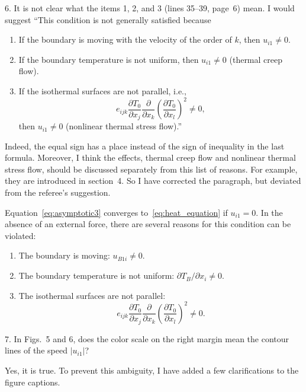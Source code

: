 \documentclass{article}
\newcommand{\pder}[2][]{\frac{\partial#1}{\partial#2}}
\newcommand{\Pder}[2][]{\partial#1/\partial#2}
\begin{document}
\begin{quoting}
6. It is not clear what the items 1, 2, and 3 (lines 35--39, page~6)
mean. I would suggest ``This condition is not generally satisfied because
\begin{enumerate}
\item If the boundary is moving with the velocity of the order of \(k\), then \(u_{i1} \neq 0\).
\item If the boundary temperature is not uniform, then \(u_{i1} \neq 0\) (thermal creep flow).
\item If the isothermal surfaces are not parallel, i.e.,
\[e_{ijk}\pder[T_0]{x_j}\pder{x_k}\left(\pder[T_0]{x_l}\right)^2 \neq 0, \]
then \(u_{i1} \neq 0\) (nonlinear thermal stress flow).''
\end{enumerate}
\end{quoting}

Indeed, the equal sign has a place instead of the sign of inequality in the last formula.
Moreover, I think the effects, thermal creep flow and nonlinear thermal stress flow, should
be discussed separately from this list of reasons. For example, they are introduced in section~4.
So I have corrected the paragraph, but deviated from the referee's suggestion.
\begin{leftbar}
Equation~\eqref{eq:asymptotic3} converges to~\eqref{eq:heat_equation} if \(u_{i1} = 0\).
In the absence of an external force, there are several reasons for this condition can be violated:
\begin{enumerate}
    \item The boundary is moving: \(u_{B1i} \neq 0 \).
    \item The boundary temperature is not uniform: \(\Pder[T_B]{x_i} \neq 0 \).
    \item The isothermal surfaces are not parallel:
        \begin{equation}\label{eq:equilibrium}
            e_{ijk}\pder[T_0]{x_j}\pder{x_k}\left(\pder[T_0]{x_l}\right)^2 \neq 0.
        \end{equation}
\end{enumerate}
\end{leftbar}

\begin{quoting}
7. In Figs.~5 and 6, does the color scale on the right margin mean the
contour lines of the speed \(|u_{i1}|\)?
\end{quoting}

Yes, it is true. To prevent this ambiguity, I have added a few clarifications to the figure captions.
\end{document}
